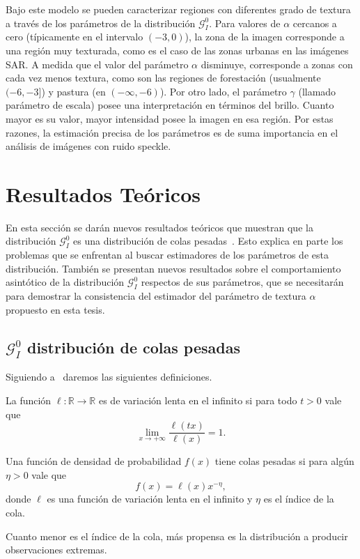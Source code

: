 Bajo este modelo se pueden caracterizar regiones con diferentes grado de textura a través de los parámetros de la distribución $\mathcal{G}_I^{0}$. Para valores de $\alpha$ cercanos a cero (típicamente en el intervalo $(-3,0)$), la zona de la imagen corresponde a una región muy texturada, como es el caso de las zonas urbanas en las imágenes SAR. A medida que el valor del parámetro $\alpha$ disminuye, corresponde a zonas con cada vez menos textura, como son las regiones de forestación (usualmente $(-6,-3]$) y pastura (en $(-\infty,-6)$). Por otro lado, el parámetro $\gamma$ (llamado parámetro de escala) posee una interpretación en términos del brillo. Cuanto mayor es su valor, mayor intensidad posee la imagen en esa región. Por estas razones, la estimación precisa de los parámetros es de suma importancia en el análisis de imágenes con ruido speckle. 



\section{Resultados Teóricos}
\label{ResultadosTeoricosGI0}

En esta sección se darán nuevos resultados teóricos que muestran que la distribución $\mathcal{G}_I^0$ es una distribución de colas pesadas~\cite{gambini2015}. Esto explica en parte los problemas que se enfrentan al buscar estimadores de los parámetros de esta distribución.  También se presentan nuevos resultados sobre el comportamiento asintótico de la distribución $\mathcal{G}_I^0$ respectos de sus parámetros, que se necesitarán para demostrar la consistencia del estimador del parámetro de textura $\alpha$ propuesto en esta tesis.

\subsection{$\mathcal{G}_I^0$ distribución de colas pesadas}
\label{colas}
Siguiendo a~\cite{Gre,Jorgensen,Rojo} daremos las siguientes definiciones.

\begin{definition} \label{Def:lenta}
	La función $\ell\colon\mathbb R \to\mathbb R$ es de variación lenta en el infinito si para todo $t>0$ vale que
	$$
	\lim_{x\to+\infty}\dfrac{\ell (tx)}{\ell(x)}=1.
	$$
\end{definition}

\begin{definition} 
	Una función de densidad de probabilidad $f(x)$ tiene colas pesadas si para algún $\eta >0$ vale que
	$$
	f(x)=\ell(x)  x^{-\eta},
	$$
	donde $\ell$ es una función de variación lenta en el infinito y $\eta$ es el índice de la cola.
\end{definition}
Cuanto menor es el índice de la cola, más propensa es la distribución a producir observaciones extremas.

